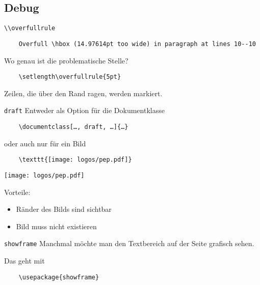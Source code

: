 \subsection{Debug}

\begin{frame}[fragile]{\lstinline+\\overfullrule+}

  \vspace{\baselineskip}
  \begin{lstlisting}
    Overfull \hbox (14.97614pt too wide) in paragraph at lines 10--10
  \end{lstlisting}
  Wo genau ist die problematische Stelle?

  \vspace{\baselineskip}
  \begin{lstlisting}
    \setlength\overfullrule{5pt}
  \end{lstlisting}

  \setlength\overfullrule{5pt}

  \vspace{\baselineskip}
  Zeilen, die über den Rand ragen, werden markiert.
\end{frame}

\begin{frame}[fragile]{\texttt{draft}}
  Entweder als Option für die Dokumentklasse
  \begin{lstlisting}
    \documentclass[…, draft, …]{…}
  \end{lstlisting}
  oder auch nur für ein Bild
  \begin{lstlisting}
    \texttt{[image: logos/pep.pdf]}
  \end{lstlisting}
  \texttt{[image: logos/pep.pdf]}

  Vorteile:
  \begin{itemize}
    \item Ränder des Bilds sind sichtbar
    \item Bild muss nicht existieren
  \end{itemize}
\end{frame}

\AddToShipoutPictureFG*{\ShowFramePicture}
\begin{frame}[fragile]{\texttt{showframe}}
  Manchmal möchte man den Textbereich auf der Seite grafisch sehen.

  Das geht mit
  \begin{lstlisting}
    \usepackage{showframe}
  \end{lstlisting}
\end{frame}

